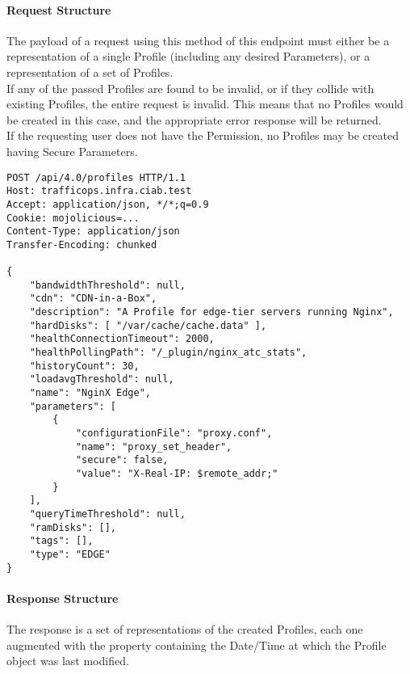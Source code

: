 \paragraph{Request Structure}
The payload of a request using this method of this endpoint must either be a
representation of a single Profile (including any desired Parameters), or a
representation of a set of Profiles.\\
If any of the passed Profiles are found to be invalid, or if they collide with
existing Profiles, the entire request is invalid. This means that no Profiles
would be created in this case, and the appropriate error response will be
returned.\\
If the requesting user does not have the  Permission,
no Profiles may be created having Secure Parameters.

\begin{codelisting}
\begin{verbatim}
POST /api/4.0/profiles HTTP/1.1
Host: trafficops.infra.ciab.test
Accept: application/json, */*;q=0.9
Cookie: mojolicious=...
Content-Type: application/json
Transfer-Encoding: chunked

{
	"bandwidthThreshold": null,
	"cdn": "CDN-in-a-Box",
	"description": "A Profile for edge-tier servers running Nginx",
	"hardDisks": [ "/var/cache/cache.data" ],
	"healthConnectionTimeout": 2000,
	"healthPollingPath": "/_plugin/nginx_atc_stats",
	"historyCount": 30,
	"loadavgThreshold": null,
	"name": "NginX Edge",
	"parameters": [
		{
			"configurationFile": "proxy.conf",
			"name": "proxy_set_header",
			"secure": false,
			"value": "X-Real-IP: $remote_addr;"
		}
	],
	"queryTimeThreshold": null,
	"ramDisks": [],
	"tags": [],
	"type": "EDGE"
}
\end{verbatim}
\end{codelisting}

\paragraph{Response Structure}
The response is a set of representations of the created Profiles, each one
augmented with the  property containing the
Date/Time at which the Profile object was last modified.

